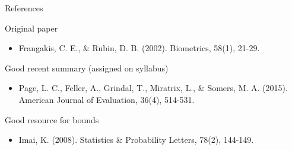 \documentclass{beamer}
\newcommand\bref[2]{\href{#1}{\color{blue}{#2}}}
\begin{document}
\begin{frame}{References}

Original paper
\begin{itemize}
\item Frangakis, C. E., \& Rubin, D. B. (2002). \bref{https://onlinelibrary.wiley.com/doi/abs/10.1111/j.0006-341x.2002.00021.x}{Principal stratification in causal inference.} Biometrics, 58(1), 21-29.
\end{itemize}
Good recent summary (assigned on syllabus)
\begin{itemize}
\item Page, L. C., Feller, A., Grindal, T., Miratrix, L., \& Somers, M. A. (2015). \bref{https://journals.sagepub.com/doi/abs/10.1177/1098214015594419}{Principal stratification: A tool for understanding variation in program effects across endogenous subgroups.} American Journal of Evaluation, 36(4), 514-531.
\end{itemize}
Good resource for bounds
\begin{itemize}
\item Imai, K. (2008). \bref{https://doi.org/10.1016/j.spl.2007.05.015}{Sharp bounds on the causal effects in randomized experiments with ``truncation-by-death''.} Statistics \& Probability Letters, 78(2), 144-149.
\end{itemize}

\end{frame}

\end{document}
